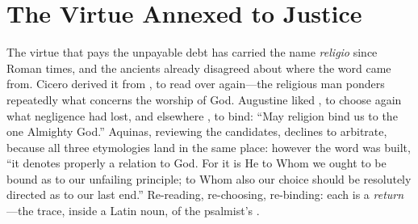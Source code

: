 \section{The Virtue Annexed to Justice}

The virtue that pays the unpayable debt has carried the name \emph{religio} since Roman times, and the ancients already disagreed about where the word came from. Cicero derived it from , to read over again---the religious man ponders repeatedly what concerns the worship of God. Augustine liked , to choose again what negligence had lost, and elsewhere , to bind: ``May religion bind us to the one Almighty God.'' Aquinas, reviewing the candidates, declines to arbitrate, because all three etymologies land in the same place: however the word was built, ``it denotes properly a relation to God. For it is He to Whom we ought to be bound as to our unfailing principle; to Whom also our choice should be resolutely directed as to our last end.'' Re-reading, re-choosing, re-binding: each is a \emph{return}---the trace, inside a Latin noun, of the psalmist's .

